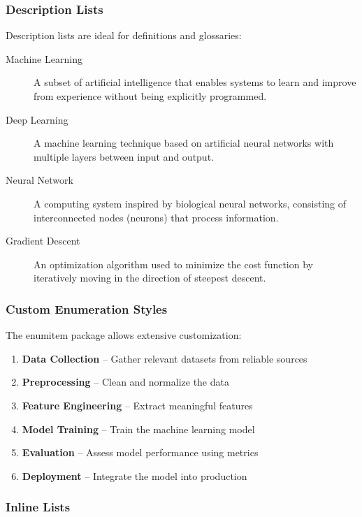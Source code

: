 \subsubsection{Description Lists}

Description lists are ideal for definitions and glossaries:

\begin{description}
    \item[Machine Learning] A subset of artificial intelligence that enables systems to learn and improve from experience without being explicitly programmed.

    \item[Deep Learning] A machine learning technique based on artificial neural networks with multiple layers between input and output.

    \item[Neural Network] A computing system inspired by biological neural networks, consisting of interconnected nodes (neurons) that process information.

    \item[Gradient Descent] An optimization algorithm used to minimize the cost function by iteratively moving in the direction of steepest descent.
\end{description}

\subsubsection{Custom Enumeration Styles}

The enumitem package allows extensive customization:

\begin{enumerate}[label=\textbf{Step \arabic*:}, leftmargin=*]
    \item \textbf{Data Collection} -- Gather relevant datasets from reliable sources
    \item \textbf{Preprocessing} -- Clean and normalize the data
    \item \textbf{Feature Engineering} -- Extract meaningful features
    \item \textbf{Model Training} -- Train the machine learning model
    \item \textbf{Evaluation} -- Assess model performance using metrics
    \item \textbf{Deployment} -- Integrate the model into production
\end{enumerate}

\subsubsection{Inline Lists}

